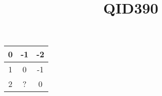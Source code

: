 \documentclass[10pt,a4paper]{article}
\title {QID390}
\begin{document}
\maketitle

\begin{tabular}{|c|c|c|}
\hline
0 & -1 & -2 \\
\hline
1 & 0  & -1 \\
\hline
2 & ? & 0 \\
\hline
\end{tabular}
\end{document}
